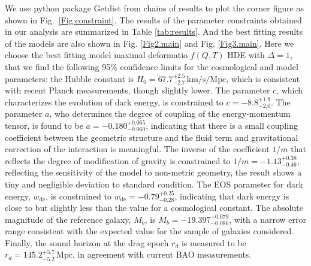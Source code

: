 \documentclass[a4paper,fleqn]{cas-sc}
\begin{document}
We use python package Getdist \cite{Lewis:2019xzd} from chains of results to plot the corner figure as shown in Fig.~\ref{Fig:constraint}. The results of the parameter constraints obtained in our analysis are summarized in Table \ref{tab:results}. And the best fitting results of the models are also shown in Fig. \ref{Fig2.main} and Fig. \ref{Fig3.main}. Here we choose the best fitting model maximal deformatio $f(Q,T)$ HDE with $\Delta=1$, that we find the following 95\% confidence limits for the cosmological and model parameters: the Hubble constant is $ H_0 = 67.7^{+2.5}_{-2.7} \, \text{km/s/Mpc} $, which is consistent with recent Planck measurements, though slightly lower. The parameter $ c $, which characterizes the evolution of dark energy, is constrained to $ c = -8.8^{+1.9}_{-2.0} $. The parameter $ a $, who determines the degree of coupling of the energy-momentum tensor, is found to be $ a = -0.180^{+0.065}_{-0.060} $, indicating that there is a small coupling coefficient between the geometric structure and the fluid term and gravitational correction of the interaction is meaningful. The inverse of the coefficient $ 1/m $ that reflects the degree of modification of gravity is constrained to $ 1/m = -1.13^{+0.38}_{-0.46} $, reflecting the sensitivity of the model to non-metric geometry, the result shows a tiny and negligible deviation to standard condition. The EOS parameter for dark energy, $ w_{\text{de}} $, is constrained to $ w_{\text{de}} = -0.79^{+0.25}_{-0.28} $, indicating that dark energy is close to but slightly less than the value for a cosmological constant. The absolute magnitude of the reference galaxy, $ M_b $, is $M_b = -19.397^{+0.079}_{-0.086}$, with a narrow error range consistent with the expected value for the sample of galaxies considered. Finally, the sound horizon at the drag epoch $r_d$ is measured to be $r_d = 145.2^{+5.7}_{-5.2} \, \text{Mpc}$, in agreement with current BAO measurements.
\end{document}
